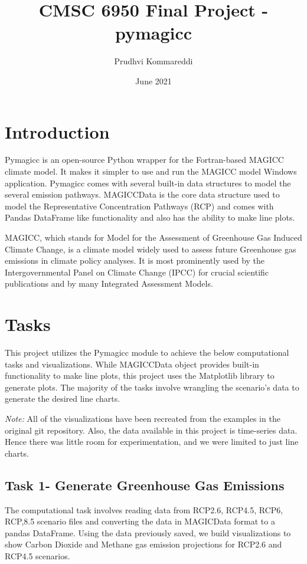 \documentclass{article}
\title{CMSC 6950 Final Project - pymagicc}
\author{Prudhvi Kommareddi}
\date{June 2021}
\begin{document}
\maketitle

\section{Introduction}
Pymagicc\cite{Gieseke2018} is an open-source Python wrapper for the Fortran-based MAGICC climate model.
It makes it simpler to use and run the MAGICC model Windows application. Pymagicc comes with several
built-in data structures to model the several emission pathways. MAGICCData is the core data structure 
used to model the Representative Concentration Pathways (RCP) and comes with Pandas DataFrame like
functionality and also has the ability to make line plots.

MAGICC, which stands for Model for the Assessment of Greenhouse Gas Induced Climate Change, is a
climate model widely used to assess future Greenhouse gas emissions in climate policy analyses.
It is most prominently used by the Intergovernmental Panel on Climate Change (IPCC) for crucial scientific
publications and by many Integrated Assessment Models.


\section{Tasks}
This project utilizes the Pymagicc module to achieve the below computational tasks and visualizations.
While MAGICCData object provides built-in functionality to make line plots, this project uses the
Matplotlib library to generate plots. The majority of the tasks involve wrangling the scenario's data
to generate the desired line charts.

\textit{Note:} All of the visualizations have been recreated from the examples in the
original git repository. Also, the data available in this project is time-series data.
Hence there was little room for experimentation, and we were limited to just line charts.

\subsection{Task 1- Generate Greenhouse Gas Emissions}
The computational task involves reading data from RCP2.6, RCP4.5, RCP6, RCP,8.5 scenario files
and converting the data in MAGICData format to a pandas DataFrame. Using the data previously saved, we
build visualizations to show Carbon Dioxide and Methane gas emission projections for RCP2.6 and RCP4.5 scenarios.
\end{document}
